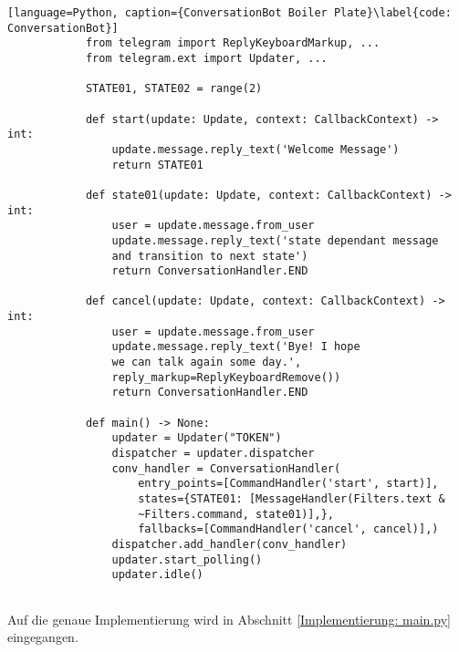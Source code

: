         \begin{lstlisting}[language=Python, caption={ConversationBot Boiler Plate}\label{code: ConversationBot}]
            from telegram import ReplyKeyboardMarkup, ...
            from telegram.ext import Updater, ... 
            
            STATE01, STATE02 = range(2)
            
            def start(update: Update, context: CallbackContext) -> int:
                update.message.reply_text('Welcome Message')
                return STATE01
            
            def state01(update: Update, context: CallbackContext) -> int:
                user = update.message.from_user
                update.message.reply_text('state dependant message 
                and transition to next state')
                return ConversationHandler.END
            
            def cancel(update: Update, context: CallbackContext) -> int:
                user = update.message.from_user
                update.message.reply_text('Bye! I hope 
                we can talk again some day.', 
                reply_markup=ReplyKeyboardRemove())
                return ConversationHandler.END
            
            def main() -> None:
                updater = Updater("TOKEN")
                dispatcher = updater.dispatcher
                conv_handler = ConversationHandler(
                    entry_points=[CommandHandler('start', start)],
                    states={STATE01: [MessageHandler(Filters.text & 
                    ~Filters.command, state01)],},
                    fallbacks=[CommandHandler('cancel', cancel)],)
                dispatcher.add_handler(conv_handler)
                updater.start_polling()
                updater.idle()
            
        \end{lstlisting}

        Auf die genaue Implementierung wird in Abschnitt \ref{Implementierung: main.py} eingegangen.


